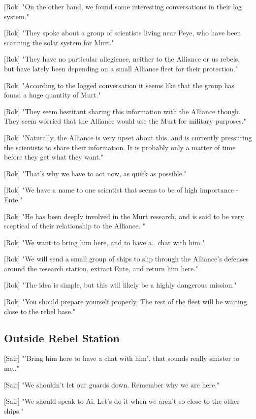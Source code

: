 \documentclass[a4paper,12pt]{article}
\begin{document}
[Rok] "On the other hand, we found some interesting conversations in their log system."

[Rok] "They spoke about a group of scientists living near Peye, who have been scanning the solar system for Murt."

[Rok] "They have no particular allegience, neither to the Alliance or us rebels, but have lately been depending on a small
Alliance fleet for their protection."

[Rok] "According to the logged conversation it seems like that the group has found a huge quantity of Murt."

[Rok] "They seem hestitant sharing this information with the Alliance though. They seem worried that the Alliance
would use the Murt for military purposes."

[Rok] "Naturally, the Alliance is very upset about this, and is currently pressuring the scientists to share their information. It is
probably only a matter of time before they get what they want."

[Rok] "That's why we have to act now, as quick as possible."

[Rok] "We have a name to one scientist that seems to be of high importance - Ente." 

[Rok] "He has been deeply involved in the Murt research, and is said to be very sceptical of their relationship to the Alliance. "

[Rok] "We want to bring him here, and to have a.. chat with him." 

[Rok] "We will send a small group of ships to slip through the Alliance's defenses around the research station, 
extract Ente, and return him here."

[Rok] "The idea is simple, but this will likely be a highly dangerous mission." 

[Rok] "You should prepare yourself properly. The rest of the fleet will be waiting close to the rebel base."

\subsection{Outside Rebel Station}

[Sair] "'Bring him here to have a chat with him', that sounds really sinister to me.." 

[Sair] "We shouldn't let our guards down. Remember why we are here." 

[Sair] "We should speak to Ai. Let's do it when we aren't so close to the other ships."
\end{document}
